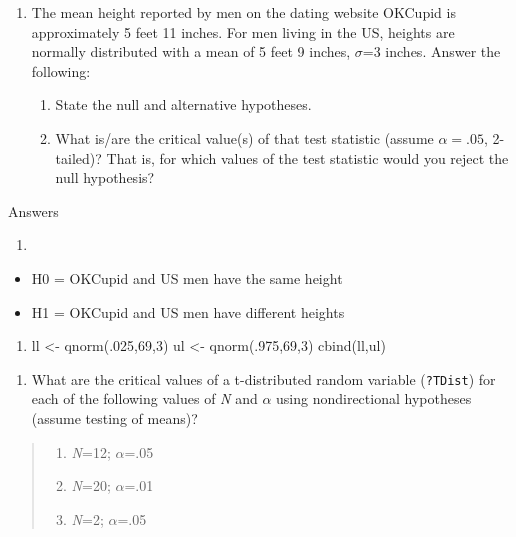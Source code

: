\documentclass[]{article}
\providecommand{\tightlist}{%
  \setlength{\itemsep}{0pt}\setlength{\parskip}{0pt}}
\begin{document}
\newpage

\begin{enumerate}
\def\labelenumi{\arabic{enumi}.}
\setcounter{enumi}{3}
\item
  The mean height reported by men on the dating website OKCupid is
  approximately 5 feet 11 inches. For men living in the US, heights are
  normally distributed with a mean of 5 feet 9 inches, \(\sigma\)=3
  inches. Answer the following:

  \begin{enumerate}
  \def\labelenumii{\alph{enumii}.}
  \tightlist
  \item
    State the null and alternative hypotheses.
  \item
    What is/are the critical value(s) of that test statistic (assume
    \(\alpha = .05\), 2-tailed)? That is, for which values of the test
    statistic would you reject the null hypothesis?
  \end{enumerate}
\end{enumerate}

Answers

\begin{enumerate}
\def\labelenumi{\alph{enumi})}
\item
\end{enumerate}

\begin{itemize}
\tightlist
\item
  H0 = OKCupid and US men have the same height
\item
  H1 = OKCupid and US men have different heights
\end{itemize}

\begin{enumerate}
\def\labelenumi{\alph{enumi})}
\setcounter{enumi}{1}
\tightlist
\item
  ll \textless{}- qnorm(.025,69,3) ul \textless{}- qnorm(.975,69,3)
  cbind(ll,ul)
\end{enumerate}

\begin{enumerate}
\def\labelenumi{\arabic{enumi}.}
\setcounter{enumi}{4}
\tightlist
\item
  What are the critical values of a t-distributed random variable
  (\texttt{?TDist}) for each of the following values of \emph{N} and
  \(\alpha\) using nondirectional hypotheses (assume testing of means)?
\end{enumerate}

\begin{quote}
\begin{enumerate}
\def\labelenumi{\alph{enumi}.}
\tightlist
\item
  \emph{N}=12; \(\alpha\)=.05
\item
  \emph{N}=20; \(\alpha\)=.01
\item
  \emph{N}=2; \(\alpha\)=.05
\end{enumerate}
\end{quote}
\end{document}
